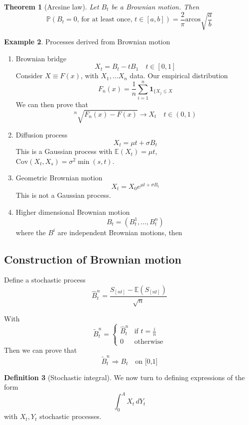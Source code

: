 \documentclass[10pt, oneside, reqno]{amsart}
\theoremstyle{plain}%
\newtheorem{thm}{Theorem}[section]
\theoremstyle{definition}
\newtheorem{defn}[thm]{Definition}
\newtheorem{exmp}[thm]{Example}
\theoremstyle{remark}
\renewcommand{\P}{\mathbb{P}}
\newcommand{\E}{\mathbb{E}}
\begin{document}
\begin{thm}[Arcsine law]
	Let $B_t$ be a Brownian motion.  Then \[
		\P(\text{$B_t = 0$, for at least once, $t \in [a,b]$}) = \frac{2}{\pi} \text{arcos} \sqrt{\frac{a}{b}}
	\]
\end{thm}

\begin{exmp}
	Processes derived from Brownian motion
	\begin{enumerate}[(1)]
		\item Brownian bridge
		\[
			X_t = B_t - t B_1 \quad t \in [0,1]
		\]
		Consider $X \equiv F(x)$, with $X_1, \dots X_n$ data.  Our empirical distribution \[
			F_n(x) = \frac{1}{n} \sum_{i=1}^n \mathbf{1}_{\{ X_j \leq X}
		\]
		We can then prove that \[
		{}^n\sqrt{F_n(x) - F(x)} \rightarrow X_t \quad t \in (0,1)
		\] 
		\item Diffusion process\[
			X_t = \mu t + \sigma B_t
		\] This is a Gaussian process with $\E(X_t) = \mu t$, $\text{Cov}(X_t, X_s) = \sigma^2 \min(s,t)$.
		\item Geometric Brownian motion\[
			X_t = X_0 e^{\mu t + \sigma B_t}
		\] This is not a Gaussian process.
		\item Higher dimensional Brownian motion\[
			B_t = ( B^1_t, \dots, B^n_t)
		\] where the $B^{i}$ are independent Brownian motions, then 

	\end{enumerate}
\end{exmp}
	
\subsection{Construction of Brownian motion} %
\label{sub:construction_of_brownian_motion}
Define a stochastic process \[
	\hat B_t^n = \frac{ S_{[nt]} - \E(S_{[nt]})}{\sqrt{n}}
\]

With \[
	\tilde B_t^n = \begin{cases}
		\hat B_t^n &\text{if $t = \frac{i}{n}$} \\
		0			&\text{otherwise}
	\end{cases}
\]
Then we can prove that \[
	\tilde B_t^n \Rightarrow B_t \quad \text{on [0,1]}
\]

\begin{defn}[Stochastic integral]
	We now turn to defining expressions of the form\[
		\int_0^A X_t \, dY_t
	\] with $X_t, Y_t$ stochastic processes.
\end{defn}
\end{document}

